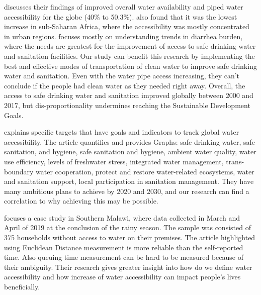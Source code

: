 \documentclass[10pt,twoside]{article}
\numberwithin{equation}{section}
\newcommand{\?}{\stackrel{?}{=}}
\begin{document}
\citet{deshpandeMappingGeographicalInequalities2020} discusses their findings of improved overall water availability and piped water accessibility for the globe (40\% to 50.3\%). \citet{deshpandeMappingGeographicalInequalities2020} also found that it was the lowest increase in sub-Saharan Africa, where the accessibility was mostly concentrated in urban regions. \citet{deshpandeMappingGeographicalInequalities2020} focuses mostly on understanding trends in diarrhea burden, where the needs are greatest for the improvement of access to safe drinking water and sanitation facilities. Our study can benefit this research by implementing the best and effective modes of transportation of clean water to improve safe drinking water and sanitation. Even with the water pipe access increasing, they can't conclude if the people had clean water as they needed right away. Overall, the access to safe drinking water and sanitation improved globally between 2000 and 2017, but dis-proportionality undermines reaching the Sustainable Development Goals. 

\citet{GoalCleanWater} explains specific targets that have goals and indicators to track global water accessibility. The article quantifies and provides Graphs: safe drinking water, safe sanitation, and hygiene, safe sanitation and hygiene, ambient water quality, water use efficiency, levels of freshwater stress, integrated water management, trans-boundary water cooperation, protect and restore water-related ecosystems, water and sanitation support, local participation in sanitation management. They have many ambitious plans to achieve by 2020 and 2030, and our research can find a correlation to why achieving this may be possible.

\citet{cassiviEvaluatingSelfreportedMeasures2021} focuses a case study in Southern Malawi, where data collected in March and April of 2019 at the conclusion of the rainy season. The sample was consisted of 375 households without access to water on their premises.   The article highlighted using Euclidean Distance measurement is more reliable than the self-reported time. Also queuing time measurement can be hard to be measured because of their ambiguity. Their research gives greater insight into how do we define water accessibility and how increase of water accessibility can impact people's lives beneficially. 
\end{document}
